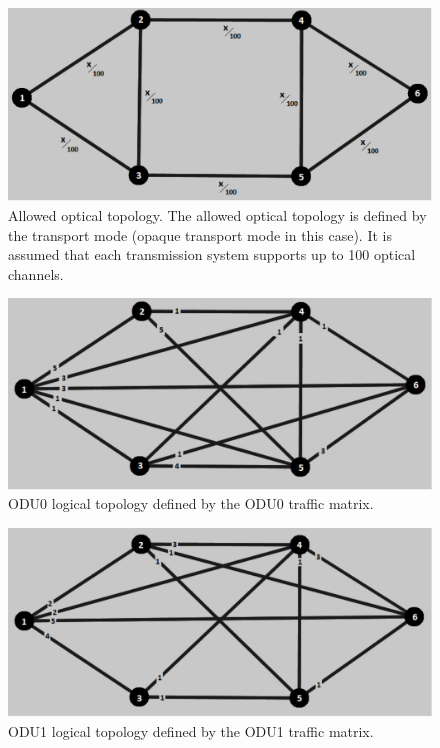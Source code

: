 \begin{figure}[H]
\centering
\includegraphics[width=13cm]{sdf/heuristic/opaque_protection/figures/allowed_optical}
\caption{Allowed optical topology. The allowed optical topology is defined by the transport mode (opaque transport mode in this case). It is assumed that each transmission system supports up to 100 optical channels.}
\label{allowed_optical_protec_ref_low_heuristic}
\end{figure}

\begin{figure}[H]
\centering
\includegraphics[width=13cm]{sdf/heuristic/opaque_protection/figures/logical_topology_odu0_low}
\caption{ODU0 logical topology defined by the ODU0 traffic matrix.}
\label{logical_ODU0_protec_ref_low_heuristic}
\end{figure}

\begin{figure}[H]
\centering
\includegraphics[width=13cm]{sdf/heuristic/opaque_protection/figures/logical_topology_odu1_low}
\caption{ODU1 logical topology defined by the ODU1 traffic matrix.}
\label{logical_ODU1_protec_ref_low_heuristic}
\end{figure}

